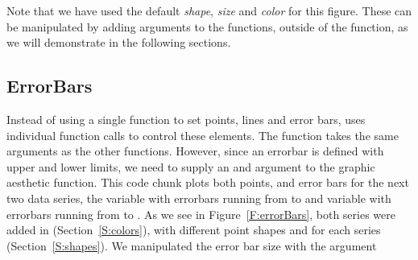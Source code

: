 \documentclass[nojss, letterpaper]{jss}\usepackage[]{graphicx}\usepackage[]{color}
\begin{document}
Note that we have used the default \emph{shape}, \emph{size} and \emph{color} for this figure. These can be manipulated by adding arguments to the  functions, outside of the  function, as we will demonstrate in the following sections.

\subsection{ErrorBars}\label{S:errorbars}

Instead of using a single function to set points, lines and error bars,  uses individual function calls to control these elements. The  function takes the same arguments as the other  functions. However, since an errorbar is defined with upper and lower limits, we need to supply an  and  argument to the graphic aesthetic function. This code chunk plots both points, and error bars for the next two data series, the  variable with errorbars running from  to  and  variable with errorbars running from  to . As we see in Figure~\ref{F:errorBars}, both series were added in  (Section~\ref{S:colors}), with different point shapes  and  for each series (Section~\ref{S:shapes}). We manipulated the error bar size with the  argument
\end{document}
